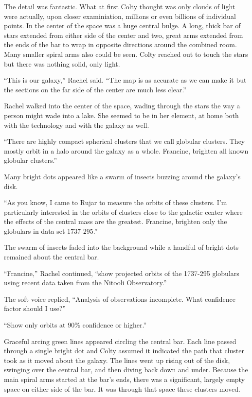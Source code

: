 The detail was fantastic. What at first Colty thought was only clouds of light were actually,
upon closer examiniation, millions or even billions of individual points. In the center of the
space was a huge central bulge. A long, thick bar of stars extended from either side of the
center and two, great arms extended from the ends of the bar to wrap in opposite directions
around the combined room. Many smaller spiral arms also could be seen. Colty reached out to
touch the stars but there was nothing solid, only light.

``This is our galaxy,'' Rachel said. ``The map is as accurate as we can make it but the sections
on the far side of the center are much less clear.''

Rachel walked into the center of the space, wading through the stars the way a person might wade
into a lake. She seemed to be in her element, at home both with the technology and with the
galaxy as well.

``There are highly compact spherical clusters that we call globular clusters. They mostly orbit
in a halo around the galaxy as a whole. Francine, brighten all known globular clusters.''

Many bright dots appeared like a swarm of insects buzzing around the galaxy's disk.

``As you know, I came to Rujar to measure the orbits of these clusters. I'm particularly
interested in the orbits of clusters close to the galactic center where the effects of the
central mass are the greatest. Francine, brighten only the globulars in data set 1737-295.''

The swarm of insects faded into the background while a handful of bright dots remained about the
central bar.

``Francine,'' Rachel continued, ``show projected orbits of the 1737-295 globulars using recent
data taken from the Nitooli Observatory.''

The soft voice replied, ``Analysis of observations incomplete. What confidence factor should I
use?''

``Show only orbits at 90\% confidence or higher.''

Graceful arcing green lines appeared circling the central bar. Each line passed through a single
bright dot and Colty assumed it indicated the path that cluster took as it moved about the
galaxy. The lines went up rising out of the disk, swinging over the central bar, and then diving
back down and under. Because the main spiral arms started at the bar's ends, there was a
significant, largely empty space on either side of the bar. It was through that space these
clusters moved.

